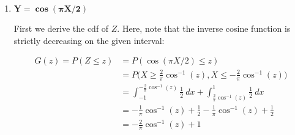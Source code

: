 \documentclass[10pt, oneside]{article}   	%
\theoremstyle{definition}
\begin{document}
\begin{enumerate}[label=5.\arabic*]
\begin{enumerate}
	\begin{proof}
	First observe that $\sin( \sin^{-1} (x)) = x$. Then $\frac{d}{dx} \sin( \sin^{-1} (x)) = \frac{d}{dx} x$, and it immediately follows that $\cos (\sin^{-1} (x)) \frac{d}{dx} \sin^{-1} (x) = 1 \implies \frac{d}{dx} \sin^{-1} (x) = \frac{1}{\cos( \sin^{-1} (x))}$. Now, using the fact that $\sin^2 y + \cos^2 y = 1$, and from that deriving $\cos y = \sqrt{1 - \sin^2 y}$, we can write $\cos (\sin^{-1} (x)) = \sqrt{1 - \sin^2 (\sin^{-1} (x))} = \sqrt{1 - x^2}$ by virtue of inverses. Therefore, $\frac{d}{dx} \sin^{-1} (x) = \frac{1}{\sqrt{1 - x^2}}$.  
	\end{proof}
	
	Proceeding, we derive:
	
	\[ G'(y) = g(y) = \frac{d}{dy} \Big( \frac{1}{\pi} \sin^{-1} (y) + \frac{1}{2} \Big) = \boxed{\frac{1}{\pi} \frac{1}{\sqrt{1 - y^2}} } \]
	
	For $Y = \sin(\pi X / 2)$ on $-1 < X < 1$, it follows that $-1 < Y < 1$. Then $g(y) \geq 0$ for $-1 < Y < 1$. Additionally, $\int^1_{-1} \frac{1}{\pi} \frac{1}{\sqrt{1 - y^2}} dy = \boxed{1}$, confirming $g(y)$ is a pdf.
	
	Alternatively, because $Y = \sin(\pi X / 2), -1 < X < 1$ is monotonic, we may apply Theorem 5.1. Finding $X = (2 / \pi) \sin^{-1} (y)$ as before, it follows that $\frac{dx}{dy} = |\frac{dx}{dy}| = \frac{2}{\pi \sqrt{1 - y^2}}$, and $g(y) = \frac{1}{2} \cdot \frac{2}{\pi \sqrt{1 - y^2}} = \frac{1}{\pi \sqrt{1-y^2}}$, as expected.
	
	\item  \begin{tcolorbox}[
	  colback=Cerulean!5!white,
	  colframe=Cerulean!75!black]
	\textbf{$\bm{Y = \cos (\pi X / 2)}$}
	\end{tcolorbox}
	
	First we derive the cdf of $Z$. Here, note that the inverse cosine function is strictly decreasing on the given interval:
	
	\begin{align*}
	G(z) = P(Z \leq z) &= P(\cos (\pi X / 2) \leq z) \\
	&= P \Big(X \geq \frac{2}{\pi} \cos^{-1} (z), X \leq -\frac{2}{\pi} \cos^{-1} (z) \Big) \\
	&= \int^{-\frac{2}{\pi} \cos^{-1} (z)}_{-1} \frac{1}{2} \ dx + \int^1_{\frac{2}{\pi} \cos^{-1} (z)} \frac{1}{2} \ dx \\
	&= -\frac{1}{\pi} \cos^{-1} (z) + \frac{1}{2} - \frac{1}{\pi} \cos^{-1} (z) + \frac{1}{2} \\
	&= -\frac{2}{\pi} \cos^{-1} (z) + 1
	\end{align*}
	

\end{enumerate}
\end{enumerate}
\end{document}
